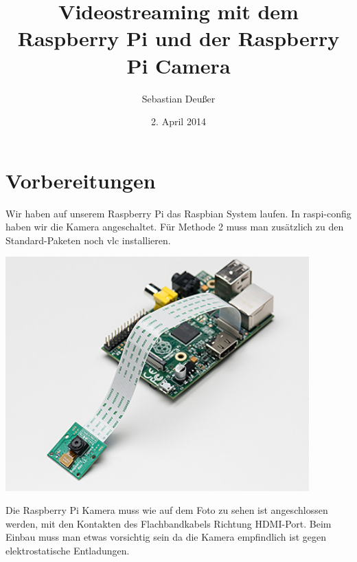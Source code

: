 \documentclass[12pt,a4paper,titlepage]{scrartcl} %
\title{Videostreaming mit dem Raspberry Pi und der Raspberry Pi Camera}
\author{Sebastian Deußer}
\date{2. April 2014} %
\begin{document}
\maketitle %

\pagestyle{fancy}
\lhead{}
\chead{\leftmark}
\rhead{}
\cfoot{}

\thispagestyle{fancy}

\section{Vorbereitungen}
Wir haben auf unserem Raspberry Pi das Raspbian System laufen. In raspi-config haben wir die Kamera angeschaltet. Für Methode 2 muss man zusätzlich zu den Standard-Paketen noch vlc installieren.
	\begin{center}
		\includegraphics[height=9cm]{Streaming/1367_MED}
	\end{center}
Die Raspberry Pi Kamera muss wie auf dem Foto zu sehen ist angeschlossen werden, mit den Kontakten des Flachbandkabels Richtung HDMI-Port. Beim Einbau muss man etwas vorsichtig sein da die Kamera empfindlich ist gegen elektrostatische Entladungen.

\newpage
\end{document}
